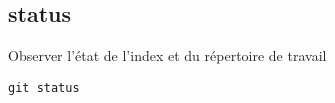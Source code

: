 \subsection*{status}
Observer l'état de l'index et du répertoire de travail
\begin{verbatim}
git status
\end{verbatim}

